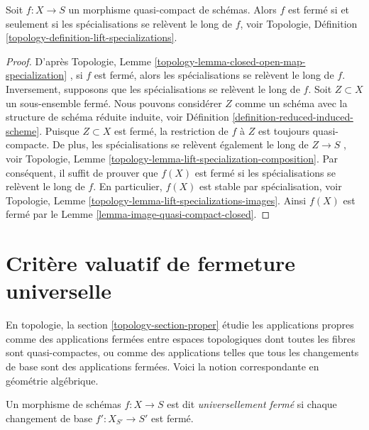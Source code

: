 \begin{lemma}
\label{lemma-quasi-compact-closed}
Soit  $f : X \to S$  un morphisme quasi-compact de schémas. Alors  $f$  est
fermé si et seulement si les spécialisations se relèvent le long de  $f$,
voir Topologie, Définition  \ref{topology-definition-lift-specializations}.
\end{lemma}

\begin{proof}
D'après Topologie, Lemme  \ref{topology-lemma-closed-open-map-specialization} , si  $f$  est fermé, alors les
spécialisations se relèvent le long de  $f$. Inversement, supposons que
les spécialisations se relèvent le long de  $f$. Soit  $Z \subset X$  un
sous-ensemble fermé. Nous pouvons considérer  $Z$  comme un schéma avec la
structure de schéma réduite induite, voir Définition  \ref{definition-reduced-induced-scheme}. Puisque
 $Z \subset X$  est fermé, la restriction de  $f$  à  $Z$  est toujours
quasi-compacte. De plus, les spécialisations se relèvent également le long de
 $Z \to S$ , voir Topologie, Lemme  \ref{topology-lemma-lift-specialization-composition}. Par conséquent, il suffit de
prouver que  $f(X)$  est fermé si les spécialisations se relèvent le long de
 $f$. En particulier,  $f(X)$  est stable par spécialisation, voir
Topologie, Lemme  \ref{topology-lemma-lift-specializations-images}. Ainsi  $f(X)$  est fermé par le Lemme
 \ref{lemma-image-quasi-compact-closed}.
\end{proof}










\section{Critère valuatif de fermeture universelle}
\label{section-valuative-criterion-universal-closedness}

\noindent
En topologie, la section  \ref{topology-section-proper}  étudie les applications propres comme des
applications fermées entre espaces topologiques dont toutes les fibres sont
quasi-compactes, ou comme des applications telles que tous les changements de base
sont des applications fermées. Voici la notion correspondante en géométrie
algébrique.

\begin{definition}
\label{definition-universally-closed}
Un morphisme de schémas  $f : X \to S$  est dit  {\it 
universellement fermé}  si chaque changement de base  $f' : X_{S'} \to S'$  est
fermé.
\end{definition}

